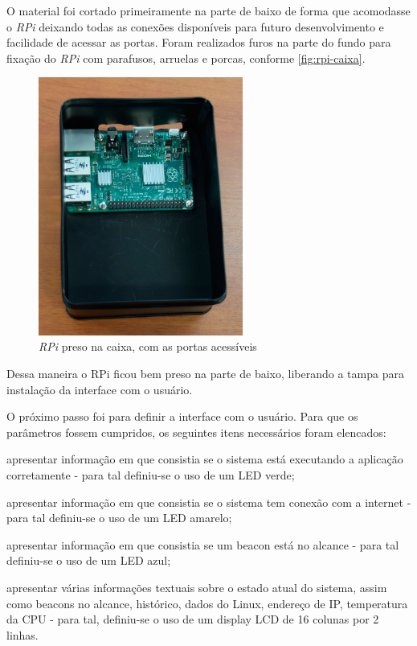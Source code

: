 O material foi cortado primeiramente na parte de baixo de forma que acomodasse o \textit{RPi} deixando todas as conexões disponíveis para futuro desenvolvimento e facilidade de acessar as portas. Foram realizados furos na parte do fundo para fixação do \textit{RPi} com parafusos, arruelas e porcas, conforme \autoref{fig:rpi-caixa}.


\begin{figure}[htb]
	\caption{\label{fig:rpi-caixa}\textit{RPi} preso na caixa, com as portas acessíveis}
	\begin{center}
		\includegraphics[width=0.6\textwidth]{img/rpi-caixa.jpg}
	\end{center}
\end{figure}

Dessa maneira o RPi ficou bem preso na parte de baixo, liberando a tampa para instalação da interface com o usuário.

O próximo passo foi para definir a interface com o usuário. Para que os parâmetros fossem cumpridos, os seguintes itens necessários foram elencados:

\begin{alineas}
	\item apresentar informação em que consistia se o sistema está executando a aplicação corretamente - para tal definiu-se o uso de um LED verde;
	\item apresentar informação em que consistia se o sistema tem conexão com a internet - para tal definiu-se o uso de um LED amarelo;
	\item apresentar informação em que consistia se um beacon está no alcance - para tal definiu-se o uso de um LED azul;
	\item apresentar várias informações textuais sobre o estado atual do sistema, assim como beacons no alcance, histórico, dados do Linux, endereço de IP, temperatura da CPU - para tal, definiu-se o uso de um display LCD de 16 colunas por 2 linhas.
\end{alineas}


